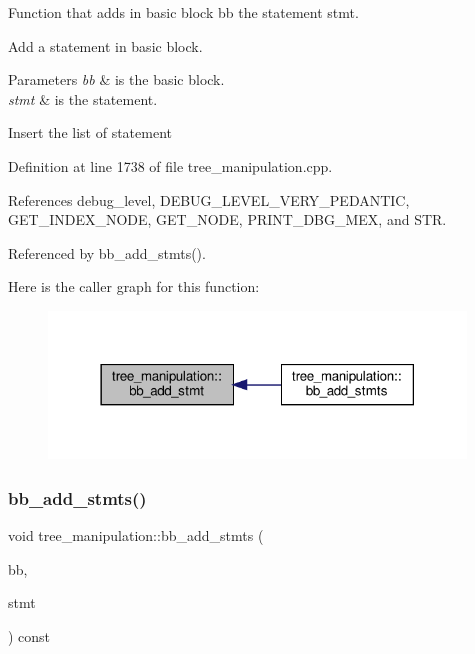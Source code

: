 Function that adds in basic block bb the statement stmt. 

Add a statement in basic block.


\begin{DoxyParams}{Parameters}
{\em bb} & is the basic block. \\
\hline
{\em stmt} & is the statement. \\
\hline
\end{DoxyParams}
Insert the list of statement 

Definition at line 1738 of file tree\+\_\+manipulation.\+cpp.



References debug\+\_\+level, D\+E\+B\+U\+G\+\_\+\+L\+E\+V\+E\+L\+\_\+\+V\+E\+R\+Y\+\_\+\+P\+E\+D\+A\+N\+T\+IC, G\+E\+T\+\_\+\+I\+N\+D\+E\+X\+\_\+\+N\+O\+DE, G\+E\+T\+\_\+\+N\+O\+DE, P\+R\+I\+N\+T\+\_\+\+D\+B\+G\+\_\+\+M\+EX, and S\+TR.



Referenced by bb\+\_\+add\+\_\+stmts().

Here is the caller graph for this function\+:
\nopagebreak
\begin{figure}[H]
\begin{center}
\leavevmode
\includegraphics[width=314pt]{d0/d99/classtree__manipulation_a601df5dd202432b92ee58a8b04f1af52_icgraph}
\end{center}
\end{figure}
\mbox{\label{classtree__manipulation_a0c96350236e7fb3907632d38aeac9ade}} 
\subsubsection{\texorpdfstring{bb\+\_\+add\+\_\+stmts()}{bb\_add\_stmts()}}
{\footnotesize\ttfamily void tree\+\_\+manipulation\+::bb\+\_\+add\+\_\+stmts (\begin{DoxyParamCaption}\item[{bloc\+Ref \&}]{bb,  }\item[{const std\+::vector$<$ \hyperlink{tree__node_8hpp_a6ee377554d1c4871ad66a337eaa67fd5}{tree\+\_\+node\+Ref} $>$ \&}]{stmt }\end{DoxyParamCaption}) const}



